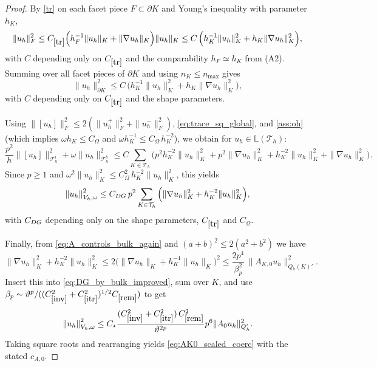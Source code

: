 \documentclass[10pt,a4paper]{amsart}
\newcommand{\Fhb}{{\calF_h^b}}
\newcommand{\Fhi}{{\calF_h^i}}
\newcommand{\Lh}{\mathbb{L}(\Th)}
\newcommand{\QKh}{Q_h(K)}
\newcommand{\Qh}{Q_h}
\newcommand{\Th}{{\calT_h}}
\newcommand{\calF}{\mathcal{F}}
\newcommand{\calT}{\mathcal{T}}
\newcommand{\const}[1]{C_{\eqref{#1}}}
\newcommand{\dgonorm}[1]{\norm{#1}_{V_h,\omega}}
\newcommand*{\norm}[1]{\left\|#1\right\|}
\begin{document}
\begin{proof}
By \eqref{tr} on each facet piece $F\subset\partial K$ and Young's inequality with parameter $h_K$,
\[
\|u_h\|_{F}^2
\le \const{tr}\Big(h_F^{-1}\|u_h\|_{K} + \|\nabla u_h\|_{K}\Big)\|u_h\|_{K}
\le C\,\Big(h_K^{-1}\|u_h\|_K^2 + h_K\|\nabla u_h\|_K^2\Big),
\]
with $C$ depending only on $\const{tr}$ and the comparability $h_F\simeq h_K$ from \textup{(A2)}.
Summing over all facet pieces of $\partial K$ and using $n_K\le n_{\max}$ gives
\begin{equation}\label{eq:trace_sq_global}
\|u_h\|_{\partial K}^2 \le C\,\Big(h_K^{-1}\|u_h\|_K^2 + h_K\|\nabla u_h\|_K^2\Big),
\end{equation}
with $C$ depending only on $\const{tr}$ and the shape parameters.

Using $\|[u_h]\|_F^2\le 2(\|u_h^+\|_F^2+\|u_h^-\|_F^2)$, \eqref{eq:trace_sq_global}, and \eqref{ass:oh}
(which implies $\omega h_K\le C_\Omega$ and $\omega h_K^{-1}\le C_\Omega\,h_K^{-2}$), we obtain for $u_h\in\Lh$:
\[
\frac{p^2}{h}\|[u_h]\|_{\Fhi}^2 + \omega\|u_h\|_{\Fhb}^2
\le C\sum_{K\in\Th}\Big(
p^2 h_K^{-2}\|u_h\|_K^2 + p^2\|\nabla u_h\|_K^2
+ h_K^{-2}\|u_h\|_K^2 + \|\nabla u_h\|_K^2
\Big).
\]
Since $p\ge 1$ and $\omega^2\|u_h\|_K^2\le C_\Omega^2\,h_K^{-2}\|u_h\|_K^2$, this yields
\begin{equation}\label{eq:DG_by_bulk_improved}
\dgonorm{u_h}^2
\le C_{\rm DG}\,p^2 \sum_{K\in\Th}\Big(\|\nabla u_h\|_K^2 + h_K^{-2}\|u_h\|_K^2\Big),
\end{equation}
with $C_{\rm DG}$ depending only on the shape parameters, $\const{tr}$ and $C_\Omega$.

Finally, from \eqref{eq:A_controls_bulk_again} and $(a+b)^2\le 2(a^2+b^2)$ we have
\[
\|\nabla u_h\|_K^2 + h_K^{-2}\|u_h\|_K^2
\le 2\Big(\|\nabla u_h\|_K + h_K^{-1}\|u_h\|_K\Big)^2
\le \frac{2p^4}{\beta_p^2}\,\|A_{K,0}u_h\|_{\QKh'}^2.
\]
Insert this into \eqref{eq:DG_by_bulk_improved}, sum over $K$, and use $\beta_p\sim \vartheta^{p}/((\const{inv}^2+\const{itr}^2)^{1/2}\const{rem})$
to get
\[
\dgonorm{u_h}^2 \le C_\star
\frac{(\const{inv}^2+\const{itr}^2)\,\const{rem}^2}{\vartheta^{2p}}
p^{6}
\|A_0u_h\|_{\Qh'}^2.
\]
Taking square roots and rearranging yields \eqref{eq:AK0_scaled_coerc} with the stated $c_{A,0}$.
\end{proof}
\end{document}
